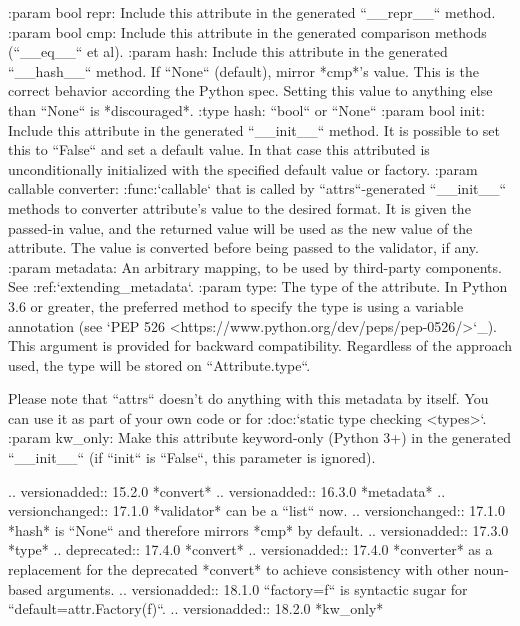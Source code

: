 \begin{DoxyVerb}
:param bool repr: Include this attribute in the generated ``__repr__``
    method.
:param bool cmp: Include this attribute in the generated comparison methods
    (``__eq__`` et al).
:param hash: Include this attribute in the generated ``__hash__``
    method.  If ``None`` (default), mirror *cmp*'s value.  This is the
    correct behavior according the Python spec.  Setting this value to
    anything else than ``None`` is *discouraged*.
:type hash: ``bool`` or ``None``
:param bool init: Include this attribute in the generated ``__init__``
    method.  It is possible to set this to ``False`` and set a default
    value.  In that case this attributed is unconditionally initialized
    with the specified default value or factory.
:param callable converter: :func:`callable` that is called by
    ``attrs``-generated ``__init__`` methods to converter attribute's value
    to the desired format.  It is given the passed-in value, and the
    returned value will be used as the new value of the attribute.  The
    value is converted before being passed to the validator, if any.
:param metadata: An arbitrary mapping, to be used by third-party
    components.  See :ref:`extending_metadata`.
:param type: The type of the attribute.  In Python 3.6 or greater, the
    preferred method to specify the type is using a variable annotation
    (see `PEP 526 <https://www.python.org/dev/peps/pep-0526/>`_).
    This argument is provided for backward compatibility.
    Regardless of the approach used, the type will be stored on
    ``Attribute.type``.

    Please note that ``attrs`` doesn't do anything with this metadata by
    itself. You can use it as part of your own code or for
    :doc:`static type checking <types>`.
:param kw_only: Make this attribute keyword-only (Python 3+)
    in the generated ``__init__`` (if ``init`` is ``False``, this
    parameter is ignored).

.. versionadded:: 15.2.0 *convert*
.. versionadded:: 16.3.0 *metadata*
.. versionchanged:: 17.1.0 *validator* can be a ``list`` now.
.. versionchanged:: 17.1.0
   *hash* is ``None`` and therefore mirrors *cmp* by default.
.. versionadded:: 17.3.0 *type*
.. deprecated:: 17.4.0 *convert*
.. versionadded:: 17.4.0 *converter* as a replacement for the deprecated
   *convert* to achieve consistency with other noun-based arguments.
.. versionadded:: 18.1.0
   ``factory=f`` is syntactic sugar for ``default=attr.Factory(f)``.
.. versionadded:: 18.2.0 *kw_only*
\end{DoxyVerb}
 \mbox{\label{namespaceattr_1_1__make_a22b2d1a5d34bb559ff4b782430408411}} 
